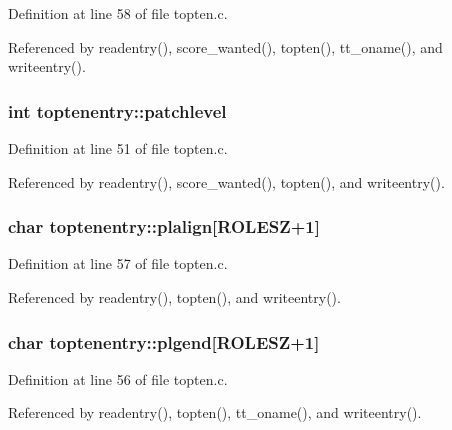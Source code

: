 Definition at line 58 of file topten.\+c.



Referenced by readentry(), score\+\_\+wanted(), topten(), tt\+\_\+oname(), and writeentry().

\hypertarget{structtoptenentry_a0b8165c6cd4ec2865b0974cc7a0a849f}{
\subsubsection[{patchlevel}]{\setlength{\rightskip}{0pt plus 5cm}int toptenentry\+::patchlevel}}\label{structtoptenentry_a0b8165c6cd4ec2865b0974cc7a0a849f}


Definition at line 51 of file topten.\+c.



Referenced by readentry(), score\+\_\+wanted(), topten(), and writeentry().

\hypertarget{structtoptenentry_aee7d9d1fb9de83e94cca805b837079f4}{
\subsubsection[{plalign}]{\setlength{\rightskip}{0pt plus 5cm}char toptenentry\+::plalign\mbox{[}{\bf R\+O\+L\+E\+S\+Z}+1\mbox{]}}}\label{structtoptenentry_aee7d9d1fb9de83e94cca805b837079f4}


Definition at line 57 of file topten.\+c.



Referenced by readentry(), topten(), and writeentry().

\hypertarget{structtoptenentry_aac92919a77981b5b61e9dee719c38333}{
\subsubsection[{plgend}]{\setlength{\rightskip}{0pt plus 5cm}char toptenentry\+::plgend\mbox{[}{\bf R\+O\+L\+E\+S\+Z}+1\mbox{]}}}\label{structtoptenentry_aac92919a77981b5b61e9dee719c38333}


Definition at line 56 of file topten.\+c.



Referenced by readentry(), topten(), tt\+\_\+oname(), and writeentry().

